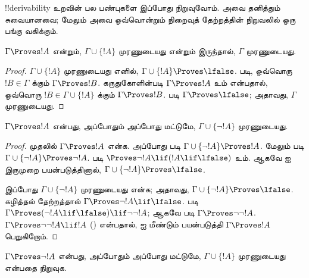 \documentclass[../../../include/open-logic-section]{subfiles}
\begin{document}
      {}
      {}


!!{derivability} உறவின் பல பண்புகளை இப்போது நிறுவுவோம். அவை தனித்தும்
சுவையானவை; மேலும் அவை ஒவ்வொன்றும் நிறைவுத் தேற்றத்தின் நிறுவலில் ஒரு பங்கு
வகிக்கும்.

\begin{prop}
  $\Gamma \Proves !A$ என்றும், $\Gamma \cup \{!A\}$ முரணுடையது என்றும்
  இருந்தால், $\Gamma$ முரணுடையது.
\end{prop}

\begin{proof}
  $\Gamma \cup \{!A\}$ முரணுடையது எனில், $\Gamma \cup \{!A\}
  \Proves \lfalse$.  படி, ஒவ்வொரு $!B \in
  \Gamma$ க்கும் $\Gamma \Proves !B$. கருதுகோளின்படி $\Gamma \Proves !A$
  உம் என்பதால், ஒவ்வொரு $!B \in \Gamma \cup \{!A\}$ க்கும் $\Gamma
  \Proves !B$.  படி $\Gamma \Proves
  \lfalse$; அதாவது, $\Gamma$ முரணுடையது.
\end{proof}

\begin{prop}
$\Gamma \Proves !A$ என்பது, அப்போதும் அப்போது மட்டுமே, $\Gamma \cup
\{\lnot !A\}$ முரணுடையது.
\end{prop}

\begin{proof}
முதலில் $\Gamma \Proves !A$ என்க. அப்போது 
படி $\Gamma \cup \{\lnot !A\} \Proves !A$. மேலும்
 படி $\Gamma \cup \{\lnot !A\} \Proves
\lnot !A$.  படி $\Proves \lnot !A \lif (!A \lif
\lfalse)$ உம். ஆகவே  ஐ இருமுறை பயன்படுத்தினால்,
$\Gamma \cup \{\lnot !A\} \Proves \lfalse$.

இப்போது $\Gamma \cup \{\lnot !A\}$ முரணுடையது என்க; அதாவது, $\Gamma
\cup \{\lnot !A\} \Proves \lfalse$. கழித்தல் தேற்றத்தால் $\Gamma
\Proves \lnot !A \lif \lfalse$.  படி $\Gamma
\Proves (\lnot !A \lif \lfalse) \lif \lnot\lnot !A$; ஆகவே
 படி $\Gamma \Proves \lnot\lnot !A$. $\Gamma \Proves
\lnot\lnot !A \lif !A$ () என்பதால்,
 ஐ மீண்டும் பயன்படுத்தி $\Gamma \Proves !A$ பெறுகிறோம்.
\end{proof}

\begin{prob}
$\Gamma \Proves \lnot !A$ என்பது, அப்போதும் அப்போது மட்டுமே, $\Gamma
\cup \{!A\}$ முரணுடையது என்பதை நிறுவுக.
\end{prob}
\end{document}

